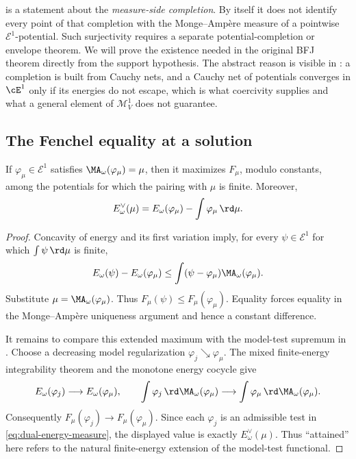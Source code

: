 \begin{remark}
\label{rem:ch28-completion-not-surjectivity}
 is a statement about the
\emph{measure-side completion}.  By itself it does not identify every point
of that completion with the Monge--Amp\`ere measure of a pointwise
$\mathcal E^1$-potential.  Such surjectivity requires a separate
potential-completion or envelope theorem.  We will prove the existence
needed in the original BFJ theorem directly from the support hypothesis.
The abstract reason is visible in
: a completion is built from Cauchy nets,
and a Cauchy net of potentials converges in $\cE^1$ only if its energies
do not escape, which is what coercivity supplies and what a general element
of $\mathcal M^1_V$ does not guarantee.
\end{remark}

\subsection{The Fenchel equality at a solution}
\label{sec:ch28-fenchel-equality}

\begin{corollary}
\label{cor:finite-energy-variational-characterization}
If $\varphi_\mu\in\mathcal E^1$ satisfies
$\MA_\omega(\varphi_\mu)=\mu$, then it maximizes $F_\mu$, modulo
constants, among the potentials for which the pairing with $\mu$ is
finite.  Moreover,
\begin{equation}
\label{eq:dual-energy-attained}
 E_\omega^\vee(\mu)
 =E_\omega(\varphi_\mu)-
      \int\varphi_\mu\,\rd \mu.
\end{equation}
\end{corollary}

\begin{proof}
Concavity of energy and its first variation imply, for every
$\psi\in\mathcal E^1$ for which $\int\psi\,\rd \mu$ is finite,
\[
 E_\omega(\psi)-E_\omega(\varphi_\mu)
 \leq\int(\psi-\varphi_\mu)\MA_\omega(\varphi_\mu).
\]
Substitute $\mu=\MA_\omega(\varphi_\mu)$.  Thus
$F_\mu(\psi)\leq F_\mu(\varphi_\mu)$.  Equality forces equality in the
Monge--Amp\`ere uniqueness argument and hence a constant difference.

It remains to compare this extended maximum with the model-test supremum
in .  Choose a decreasing model
regularization $\varphi_j\searrow\varphi_\mu$.  The mixed
finite-energy integrability theorem and the monotone energy cocycle give
\[
 E_\omega(\varphi_j)\longrightarrow E_\omega(\varphi_\mu),
 \qquad
 \int\varphi_j\,\rd \MA_\omega(\varphi_\mu)
   \longrightarrow
 \int\varphi_\mu\,\rd \MA_\omega(\varphi_\mu).
\]
Consequently $F_\mu(\varphi_j)\to F_\mu(\varphi_\mu)$.  Since each
$\varphi_j$ is an admissible test in
\eqref{eq:dual-energy-measure}, the displayed value is exactly
$E_\omega^\vee(\mu)$.  Thus ``attained'' here refers to the natural
finite-energy extension of the model-test functional.
\end{proof}

